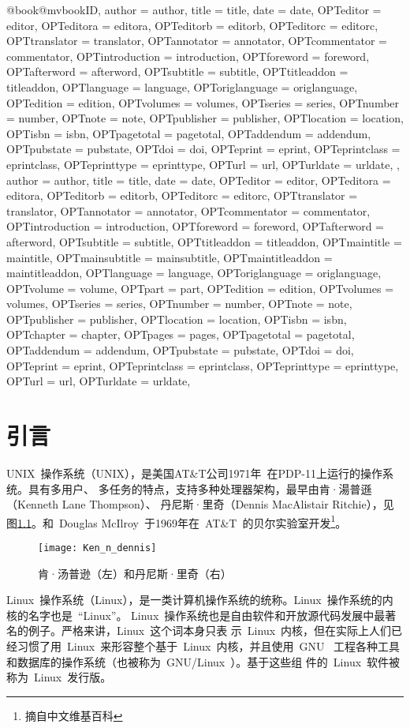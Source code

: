 @book{@mvbook{ID,
		author = {author},
		title = {title},
		date = {date},
		OPTeditor = {editor},
		OPTeditora = {editora},
		OPTeditorb = {editorb},
		OPTeditorc = {editorc},
		OPTtranslator = {translator},
		OPTannotator = {annotator},
		OPTcommentator = {commentator},
		OPTintroduction = {introduction},
		OPTforeword = {foreword},
		OPTafterword = {afterword},
		OPTsubtitle = {subtitle},
		OPTtitleaddon = {titleaddon},
		OPTlanguage = {language},
		OPToriglanguage = {origlanguage},
		OPTedition = {edition},
		OPTvolumes = {volumes},
		OPTseries = {series},
		OPTnumber = {number},
		OPTnote = {note},
		OPTpublisher = {publisher},
		OPTlocation = {location},
		OPTisbn = {isbn},
		OPTpagetotal = {pagetotal},
		OPTaddendum = {addendum},
		OPTpubstate = {pubstate},
		OPTdoi = {doi},
		OPTeprint = {eprint},
		OPTeprintclass = {eprintclass},
		OPTeprinttype = {eprinttype},
		OPTurl = {url},
		OPTurldate = {urldate},
	}
	,
	author = {author},
	title = {title},
	date = {date},
	OPTeditor = {editor},
	OPTeditora = {editora},
	OPTeditorb = {editorb},
	OPTeditorc = {editorc},
	OPTtranslator = {translator},
	OPTannotator = {annotator},
	OPTcommentator = {commentator},
	OPTintroduction = {introduction},
	OPTforeword = {foreword},
	OPTafterword = {afterword},
	OPTsubtitle = {subtitle},
	OPTtitleaddon = {titleaddon},
	OPTmaintitle = {maintitle},
	OPTmainsubtitle = {mainsubtitle},
	OPTmaintitleaddon = {maintitleaddon},
	OPTlanguage = {language},
	OPToriglanguage = {origlanguage},
	OPTvolume = {volume},
	OPTpart = {part},
	OPTedition = {edition},
	OPTvolumes = {volumes},
	OPTseries = {series},
	OPTnumber = {number},
	OPTnote = {note},
	OPTpublisher = {publisher},
	OPTlocation = {location},
	OPTisbn = {isbn},
	OPTchapter = {chapter},
	OPTpages = {pages},
	OPTpagetotal = {pagetotal},
	OPTaddendum = {addendum},
	OPTpubstate = {pubstate},
	OPTdoi = {doi},
	OPTeprint = {eprint},
	OPTeprintclass = {eprintclass},
	OPTeprinttype = {eprinttype},
	OPTurl = {url},
	OPTurldate = {urldate},
}
\chapter{引言}
\label{cha:intro}
UNIX~操作系统（UNIX），是美国AT\&T公司1971年~在PDP-11上运行的操作系统。具有多用户、
多任务的特点，支持多种处理器架构，最早由肯·湯普遜（Kenneth Lane Thompson）、
丹尼斯·里奇（Dennis MacAlistair Ritchie），见图\ref{fig:ken}。和~Douglas
McIlroy~于1969年在~AT\&T~的贝尔实验室开发\footnote{摘自中文维基百科}。\par
\begin{figure}[htbp]
    \centering
	\texttt{[image: Ken\_n\_dennis]}
    \caption{肯·汤普逊（左）和丹尼斯·里奇（右）}
    \label{fig:ken}
\end{figure}
Linux~操作系统（Linux），是一类计算机操作系统的统称。Linux~操作系统的内核的名字也是~“Linux”。
Linux~操作系统也是自由软件和开放源代码发展中最著名的例子。严格来讲，Linux~这个词本身只表
示~Linux~内核，但在实际上人们已经习惯了用~Linux~来形容整个基于~Linux~内核，并且使用~GNU~
工程各种工具和数据库的操作系统（也被称为~GNU/Linux~）。基于这些组
件的~Linux~软件被称为~Linux~发行版。

